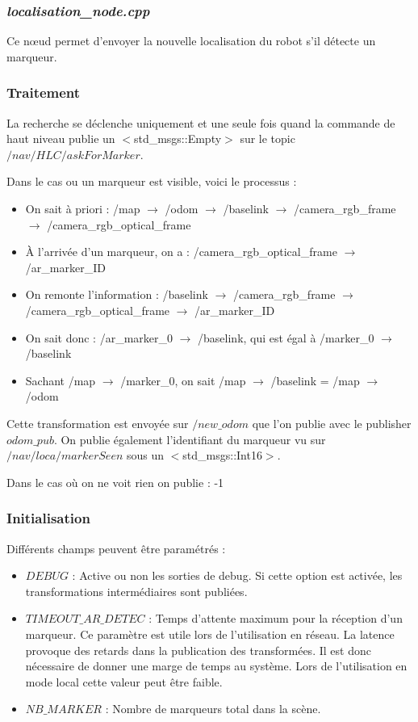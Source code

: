 \documentclass[10pt,a4paper]{article}
\begin{document}
\subsubsection{\textit{localisation\_node.cpp}}
Ce nœud permet d'envoyer la nouvelle localisation du robot s'il détecte un marqueur. 

\subsubsection{Traitement}
\noindent La recherche se déclenche uniquement et une seule fois quand la commande de haut niveau publie un $<$std\_msgs::Empty$>$ sur le topic $/nav/HLC/askForMarker$. 

\noindent Dans le cas ou un marqueur est visible, voici le processus : 
\begin{itemize}
\item On sait à priori : /map $\rightarrow$ /odom $\rightarrow$ /baselink $\rightarrow$ /camera\_rgb\_frame $\rightarrow$ /camera\_rgb\_optical\_frame 
\item À l'arrivée d'un marqueur, on a : /camera\_rgb\_optical\_frame $\rightarrow$ /ar\_marker\_ID 
\item On remonte l'information : /baselink $\rightarrow$ /camera\_rgb\_frame $\rightarrow$ /camera\_rgb\_optical\_frame $\rightarrow$ /ar\_marker\_ID
\item On sait donc : /ar\_marker\_0 $\rightarrow$ /baselink, qui est égal à /marker\_0 $\rightarrow$ /baselink 
\item Sachant /map $\rightarrow$ /marker\_0, on sait /map $\rightarrow$ /baselink = /map  $\rightarrow$ /odom 
\end{itemize}

Cette transformation est envoyée sur $/new\_odom$ que l'on publie avec le publisher $odom\_pub$. On publie également l'identifiant du marqueur vu sur $/nav/loca/markerSeen$ sous un $<$std\_msgs::Int16$>$. 

\noindent Dans le cas où on ne voit rien on publie : -1 

\subsubsection{Initialisation}
\noindent Différents champs peuvent être paramétrés : 
\begin{itemize}
\item $DEBUG$ : Active ou non les sorties de debug. Si cette option est activée, les transformations intermédiaires sont publiées.
\item $TIMEOUT\_AR\_DETEC$ : Temps d'attente maximum pour la réception d'un marqueur. Ce paramètre est utile lors de l'utilisation en réseau. La latence provoque des retards dans la publication des transformées. Il est donc nécessaire de donner une marge de temps au système. Lors de l'utilisation en mode local cette valeur peut \^etre faible.
\item $NB\_MARKER$ : Nombre de marqueurs total dans la scène.
\end{itemize}
\end{document}
